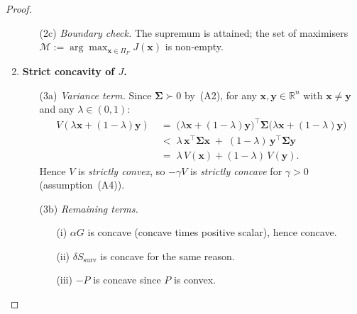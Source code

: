 \documentclass[12pt,openany]{book}
\newcommand{\bfx}{\mathbf{x}}
\newcommand{\bfy}{\mathbf{y}}
\numberwithin{equation}{chapter}
\theoremstyle{plain}
\theoremstyle{definition}
\theoremstyle{remark}
\numberwithin{equation}{chapter}
\theoremstyle{plain}
\newcommand{\bfSigma}{\boldsymbol{\Sigma}}
\begin{document}
\begin{proof}
\begin{enumerate}
\begin{enumerate}
  \item[\textup{(2c)}] \textit{Boundary check.}
        The supremum is attained; the set of maximisers
        $\mathcal{M} := \arg\max_{\bfx \in \Pi_F} J(\bfx)$
        is non-empty.
\end{enumerate}

\item \textbf{Strict concavity of $J$.}

\begin{enumerate}
  \item[\textup{(3a)}] \textit{Variance term.}
        Since $\bfSigma \succ 0$ by~(A2), for any
        $\bfx, \bfy \in \mathbb{R}^n$ with $\bfx \neq \bfy$ and
        any $\lambda \in (0,1)$:
        \begin{align}
          V\!\left(\lambda\bfx + (1-\lambda)\bfy\right)
            &\;=\; \bigl(\lambda\bfx+(1-\lambda)\bfy\bigr)^\top
                   \bfSigma
                   \bigl(\lambda\bfx+(1-\lambda)\bfy\bigr)
          \nonumber\\
            &\;<\; \lambda\,\bfx^\top\bfSigma\bfx
                   \;+\;(1-\lambda)\,\bfy^\top\bfSigma\bfy
          \nonumber\\
            &\;=\; \lambda\,V(\bfx)+(1-\lambda)\,V(\bfy).
          \label{eq:V-strictly-convex}
        \end{align}
        Hence $V$ is \emph{strictly convex}, so $-\gamma V$ is
        \emph{strictly concave} for $\gamma > 0$ (assumption~(A4)).

  \item[\textup{(3b)}] \textit{Remaining terms.}
        \begin{enumerate}
          \item[\textup{(i)}] $\alpha G$ is concave (concave times
                positive scalar), hence concave.
          \item[\textup{(ii)}] $\delta S_{\mathrm{surv}}$ is
                concave for the same reason.
          \item[\textup{(iii)}] $-P$ is concave since $P$ is
                convex.
        \end{enumerate}


\end{enumerate}
\end{enumerate}
\end{proof}
\end{document}
